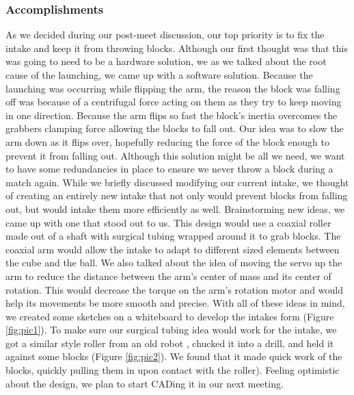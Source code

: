\subsubsection*{Accomplishments}
As we decided during our post-meet discussion, our top priority is to fix the intake and keep it from throwing blocks. Although our first thought was that this was going to need to be a hardware solution, we as we talked about the root cause of the launching, we came up with a software solution. Because the launching was occurring while flipping the arm, the reason the block was falling off was because of a centrifugal force acting on them as they try to keep moving in one direction. Because the arm flips so fast the block’s inertia overcomes the grabbers clamping force allowing the blocks to fall out. Our idea was to slow the arm down as it flips over, hopefully reducing the force of the block enough to prevent it from falling out.
Although this solution might be all we need, we want to have some redundancies in place to ensure we never throw a block during a match again. While we briefly discussed modifying our current intake, we thought of creating an entirely new intake that not only would prevent blocks from falling out, but would intake them more efficiently as well. Brainstorming new ideas, we came up with one that stood out to us. This design would use a coaxial roller made out of a shaft with surgical tubing wrapped around it to grab blocks. The coaxial arm would allow the intake to adapt to different sized elements between the cube and the ball. We also talked about the idea of moving the servo up the arm to reduce the distance between the arm’s center of mass and its center of rotation. This would decrease the torque on the arm’s rotation motor and would help its movements be more smooth and precise. With all of these ideas in mind, we created some sketches on a whiteboard to develop the intakes form (Figure \ref{fig:pic1}).
To make sure our surgical tubing idea would work for the intake, we got a similar style roller from an old robot  , chucked it into a drill, and held it against some blocks (Figure \ref{fig:pic2}). We found that it made quick work of the blocks, quickly pulling them in upon contact with the roller). Feeling optimistic about the design, we plan to start CADing it in our next meeting. 


